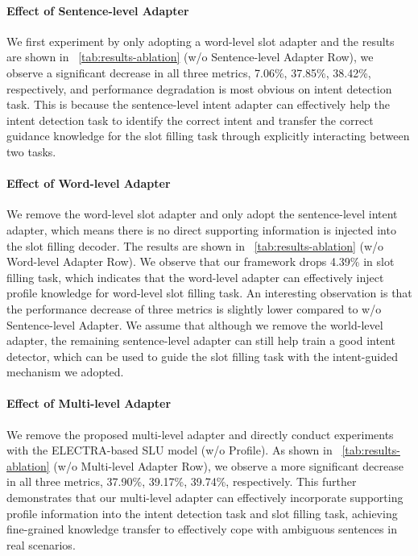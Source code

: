 \documentclass[letterpaper]{article} \usepackage{aaai22}  \usepackage{times}  \usepackage{helvet}  \usepackage{courier}  \usepackage[hyphens]{url}  \usepackage{graphicx} \urlstyle{rm} \def\UrlFont{\rm}  \usepackage{natbib}  \usepackage{caption} \DeclareCaptionStyle{ruled}{labelfont=normalfont,labelsep=colon,strut=off} \frenchspacing  \setlength{\pdfpagewidth}{8.5in}  \setlength{\pdfpageheight}{11in}  \usepackage{algorithm}
\begin{document}
\paragraph{Effect of Sentence-level Adapter}
We first experiment by only adopting a word-level slot adapter and the results are shown in \tablename~\ref{tab:results-ablation} (w/o Sentence-level Adapter Row), we observe a significant decrease in all three metrics, 7.06\%, 37.85\%, 38.42\%, respectively, and performance degradation is most obvious on intent detection task.
This is because the sentence-level intent adapter can effectively help the intent detection task to identify the correct intent and transfer the correct guidance knowledge for the slot filling task through explicitly interacting between two tasks. 

\paragraph{Effect of Word-level Adapter}
We remove the word-level slot adapter and only adopt the sentence-level intent adapter, which means there is no direct supporting information is injected into the slot filling decoder.
The results are shown in \tablename~\ref{tab:results-ablation} (w/o Word-level Adapter Row).
We observe that our framework drops 4.39\% in slot filling task, which indicates that the word-level adapter can effectively inject profile knowledge for word-level slot filling task.
An interesting observation is that the performance decrease of three metrics is slightly lower compared to w/o Sentence-level Adapter. We assume that although we remove the world-level adapter, the remaining sentence-level adapter can still help train a good intent detector, which can be used to guide the slot filling task with the intent-guided mechanism we adopted.

\paragraph{Effect of Multi-level Adapter}
We remove the proposed multi-level adapter and directly conduct experiments with the ELECTRA-based SLU model (w/o Profile).
As shown in \tablename~\ref{tab:results-ablation} (w/o Multi-level Adapter Row), we observe a more significant decrease in all three metrics, 37.90\%, 39.17\%, 39.74\%, respectively.
This further demonstrates that our multi-level adapter can effectively incorporate supporting profile information into the intent detection task and slot filling task, achieving fine-grained knowledge transfer to effectively cope with ambiguous sentences in real scenarios.
\end{document}
